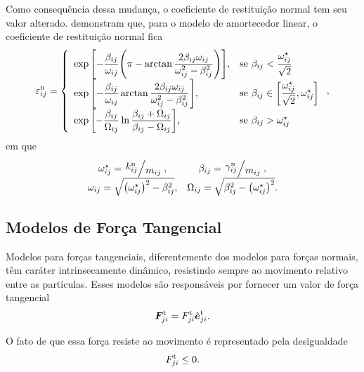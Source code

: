 Como consequência dessa mudança, o coeficiente de restituição normal tem seu valor alterado.  demonstram que, para o modelo de amortecedor linear, o coeficiente de restituição normal fica
\begin{equation*}
	\normalCoefficientOfRestitutionij = 
	\left\lbrace
		\def\arraystretch{1.8}
		\begin{array}{ll}
			\exp\bqty{-\dfrac{\betaij}{\omegaij}\pqty{\pi - \arctan\dfrac{2\betaij\omegaij}{\omegaij^2-\betaij^2}}}, & \text{se } \betaij < \dfrac{\omegazij}{\sqrt{2}} \\
			\exp\bqty{-\dfrac{\betaij}{\omegaij}\arctan\dfrac{2\betaij\omegaij}{\omegaij^2-\betaij^2}}, & \text{se } \betaij \in \bqty{\dfrac{\omegazij}{\sqrt{2}}, \omegazij} \\
			\exp\bqty{-\dfrac{\betaij}{\Omegaij} \ln\dfrac{\betaij + \Omegaij}{\betaij - \Omegaij}}, & \text{se } \betaij > \omegazij
		\end{array}
	\right.
	,
\end{equation*}
em que
\begin{equation*}
	\def\arraystretch{1.5}
	\begin{array}{cc}
		\omegazij = \bigslant{\effectiveNormalElasticij}{\massij}, &
		\betaij = \bigslant{\normalDampingConstantij}{\massij}, \\
		\omegaij = \sqrt{\pqty{\omegazij}^2 - \betaij^2}, &	\Omegaij = \sqrt{\betaij^2 - \pqty{\omegazij}^2}.
	\end{array}
\end{equation*}

\subsection{Modelos de Força Tangencial} \label{subsec:tangential_force_models}

Modelos para forças tangenciais, diferentemente dos modelos para forças normais, têm caráter intrinsecamente dinâmico, resistindo sempre ao movimento relativo entre as partículas. Esses modelos são responsáveis por fornecer um valor de força tangencial
\begin{equation*}
	{\bm{F}}_{j i}^{\text{t}} = {F}_{j i}^{\text{t}}{\hat{\bm{e}}}_{j i}^{\text{t}}.
\end{equation*}

O fato de que essa força resiste ao movimento é representado pela desigualdade
\begin{equation*}
	{F}_{j i}^{\text{t}} \leq 0.
\end{equation*}

